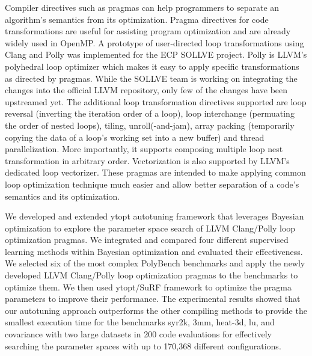Compiler directives such as pragmas can help programmers to separate an algorithm's semantics from its optimization. Pragma directives for code transformations are useful for assisting program optimization and are already widely used in OpenMP. A prototype of user-directed loop transformations using Clang and Polly was implemented for the ECP SOLLVE project.
Polly is LLVM's polyhedral loop optimizer which makes it easy to apply specific transformations as directed by pragmas.
While the SOLLVE team is working on integrating the changes into the official LLVM repository, only few of the changes have been upstreamed yet.
The additional loop transformation directives supported are loop reversal (inverting the iteration order of a loop), loop interchange (permuating the order of nested loops), tiling, unroll(-and-jam), array packing (temporarily copying the data of a loop's working set into a new buffer) and thread parallelization. 
More importantly, it supports composing multiple loop nest transformation in arbitrary order. Vectorization is also supported by LLVM's dedicated loop vectorizer.
These pragmas are intended to make applying common loop optimization technique much easier and allow better separation of a code's semantics and its optimization.

We developed and extended ytopt autotuning framework that leverages Bayesian optimization to explore the parameter space search of LLVM Clang/Polly loop optimization pragmas. We integrated and compared four different supervised learning methods within Bayesian optimization and evaluated their effectiveness. We selected six of the most complex PolyBench benchmarks and apply the newly developed LLVM Clang/Polly loop optimization pragmas to the benchmarks to optimize them. We then used ytopt/SuRF framework to optimize the pragma parameters to improve their performance. The experimental results showed that our autotuning approach outperforms the other compiling methods to provide the smallest execution time for the benchmarks syr2k, 3mm, heat-3d, lu, and covariance with two large datasets in 200 code evaluations for effectively searching the parameter spaces with up to 170,368 different configurations. 

